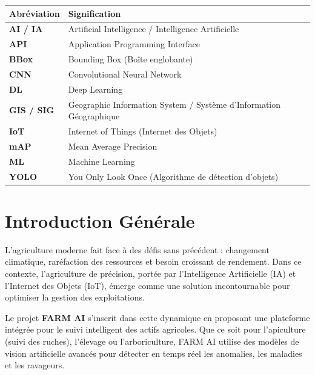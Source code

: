 \documentclass[12pt,a4paper,oneside]{report}
\begin{document}
\begin{tabular}{ll}
\toprule
\textbf{Abréviation} & \textbf{Signification} \\
\midrule
\textbf{AI / IA}  & Artificial Intelligence / Intelligence Artificielle \\
\textbf{API}      & Application Programming Interface \\
\textbf{BBox}     & Bounding Box (Boîte englobante) \\
\textbf{CNN}      & Convolutional Neural Network \\
\textbf{DL}       & Deep Learning \\
\textbf{GIS / SIG} & Geographic Information System / Système d'Information Géographique \\
\textbf{IoT}      & Internet of Things (Internet des Objets) \\
\textbf{mAP}      & Mean Average Precision \\
\textbf{ML}       & Machine Learning \\
\textbf{YOLO}     & You Only Look Once (Algorithme de détection d'objets) \\
\bottomrule
\end{tabular}

\chapter*{Introduction Générale}
\thispagestyle{plain}

L'agriculture moderne fait face à des défis sans précédent : changement climatique, raréfaction des ressources et besoin croissant de rendement. Dans ce contexte, l'agriculture de précision, portée par l'Intelligence Artificielle (IA) et l'Internet des Objets (IoT), émerge comme une solution incontournable pour optimiser la gestion des exploitations.

Le projet \textbf{FARM AI} s'inscrit dans cette dynamique en proposant une plateforme intégrée pour le suivi intelligent des actifs agricoles. Que ce soit pour l'apiculture (suivi des ruches), l'élevage ou l'arboriculture, FARM AI utilise des modèles de vision artificielle avancés pour détecter en temps réel les anomalies, les maladies et les ravageurs.
\end{document}
